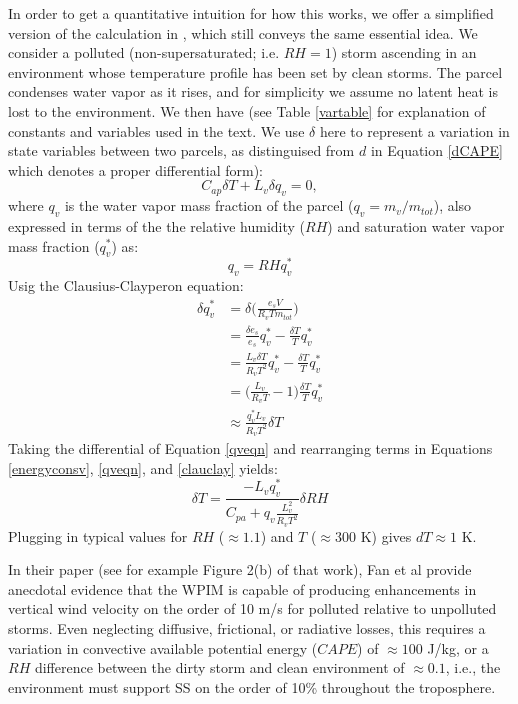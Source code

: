 \documentclass{article}
\begin{document}
In order to get a quantitative intuition for how this works, we offer a simplified version of the calculation in \cite{Grabowski2015}, which still conveys the same essential idea. We consider a polluted (non-supersaturated; i.e. $RH=1$) storm ascending in an environment whose temperature profile has been set by clean storms. The parcel condenses water vapor as it rises, and for simplicity we assume no latent heat is lost to the environment. We then have (see Table \ref{vartable} for explanation of constants and variables used in the text. We use $\delta$ here to represent a variation in state variables between two parcels, as distinguised from $d$ in Equation \ref{dCAPE} which denotes a proper differential form):
\begin{equation}
\label{energyconsv}
C_{ap}\delta T + L_v\delta q_v = 0,
\end{equation}
where $q_v$ is the water vapor mass fraction of the parcel ($q_v=m_v/m_{tot}$), also expressed in terms of the the relative humidity ($RH$) and saturation water vapor mass fraction ($q_v^*$) as:
\begin{equation}
\label{qveqn}
q_v = RHq_v^*
\end{equation}
Usig the Clausius-Clayperon equation:
\begin{align}
\label{clauclay}
\delta q_v^* &= \delta \Big(\frac{e_sV}{R_vTm_{tot}}\Big)\nonumber\\ 
&=\frac{\delta e_s}{e_s}q_v^* - \frac{\delta T}{T}q_v^*\nonumber\\ 
&=\frac{L_v\delta T}{R_vT^2}q_v^* - \frac{\delta T}{T}q_v^*\nonumber\\ 
&=\Big(\frac{L_v}{R_vT} - 1\Big)\frac{\delta T}{T}q_v^*\nonumber\\ 
&\approx \frac{q_v^*L_v}{R_vT^2}\delta T 
\end{align}
Taking the differential of Equation \ref{qveqn} and rearranging terms in Equations \ref{energyconsv}, \ref{qveqn}, and \ref{clauclay} yields:
\begin{equation}
\label{dT}
\delta T = \frac{-L_vq_v^*}{C_{pa} + q_v\frac{L_v^2}{R_vT^2}}\delta RH
\end{equation}
Plugging in typical values for $RH$ ($\approx 1.1$) and $T$ ($\approx 300$ K) gives $dT\approx 1$ K.

In their paper (see for example Figure 2(b) of that work), Fan et al provide anecdotal evidence that the WPIM is capable of producing enhancements in vertical wind velocity on the order of 10 m/s for polluted relative to unpolluted storms. Even neglecting diffusive, frictional, or radiative losses, this requires a variation in convective available potential energy ($CAPE$) of $\approx 100$ J/kg, or a $RH$ difference between the dirty storm and clean environment of $\approx 0.1$, i.e., the environment must support SS on the order of 10\% throughout the troposphere.
\end{document}
